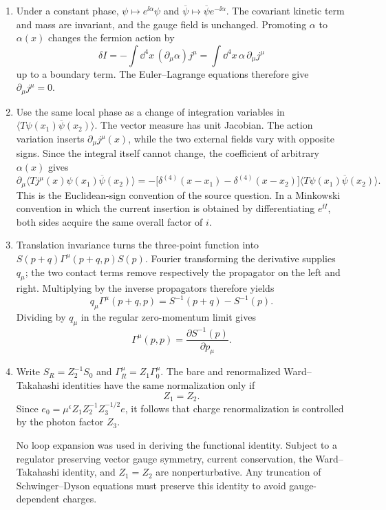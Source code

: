 \begin{enumerate}
  \begin{enumerate}
    \item[(a)]
    Under a constant phase,
    \(\psi\mapsto e^{\ii\alpha}\psi\) and
    \(\overline\psi\mapsto\overline\psi e^{-\ii\alpha}\).
    The covariant kinetic term and mass are invariant, and the gauge field
    is unchanged.  Promoting \(\alpha\) to \(\alpha(x)\) changes the
    fermion action by
    \[
      \delta I=-\int \dd^4x\,(\partial_\mu\alpha)j^\mu
        =\int \dd^4x\,\alpha\,\partial_\mu j^\mu
    \]
    up to a boundary term.  The Euler--Lagrange equations therefore give
    \(\partial_\mu j^\mu=0\).
    \item[(b)]
    Use the same local phase as a change of integration variables in
    \(\langle T\psi(x_1)\overline\psi(x_2)\rangle\).  The vector measure has
    unit Jacobian.  The action variation inserts
    \(\partial_\mu j^\mu(x)\), while the two external fields vary with
    opposite signs.  Since the integral itself cannot change, the
    coefficient of arbitrary \(\alpha(x)\) gives
    \[
      \boxed{\partial_\mu
      \langle Tj^\mu(x)\psi(x_1)\overline\psi(x_2)\rangle
       =-\bigl[\delta^{(4)}(x-x_1)-\delta^{(4)}(x-x_2)\bigr]
        \langle T\psi(x_1)\overline\psi(x_2)\rangle.}
    \]
    This is the Euclidean-sign convention of the source question.
    In a Minkowski convention in which the current insertion is obtained
    by differentiating \(e^{\ii I}\), both sides acquire the same overall
    factor of \(i\).
    \item[(c)]
    Translation invariance turns the three-point function into
    \(S(p+q)\Gamma^\mu(p+q,p)S(p)\).  Fourier transforming the derivative
    supplies \(q_\mu\); the two contact terms remove respectively the
    propagator on the left and right.  Multiplying by the inverse
    propagators therefore yields
    \[
      \boxed{q_\mu\Gamma^\mu(p+q,p)
        =S^{-1}(p+q)-S^{-1}(p).}
    \]
    Dividing by \(q_\mu\) in the regular zero-momentum limit gives
    \[
      \boxed{\Gamma^\mu(p,p)
        =\frac{\partial S^{-1}(p)}{\partial p_\mu}.}
    \]
    \item[(d)]
    Write \(S_R=Z_2^{-1}S_0\) and
    \(\Gamma_R^\mu=Z_1\Gamma_0^\mu\).  The bare and renormalized
    Ward--Takahashi identities have the same normalization only if
    \[
      \boxed{Z_1=Z_2}.
    \]
    Since
    \(e_0=\mu^\epsilon Z_1Z_2^{-1}Z_3^{-1/2}e\), it follows that charge
    renormalization is controlled by the photon factor \(Z_3\).

    No loop expansion was used in deriving the functional identity.
    Subject to a regulator preserving vector gauge symmetry, current
    conservation, the Ward--Takahashi identity, and \(Z_1=Z_2\) are
    nonperturbative.  Any truncation of Schwinger--Dyson equations must
    preserve this identity to avoid gauge-dependent charges.
  \end{enumerate}

\end{enumerate}
